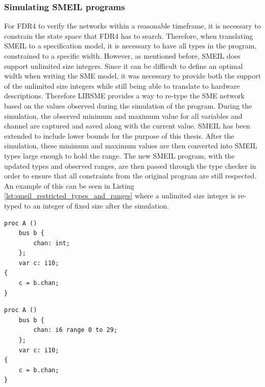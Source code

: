 \subsubsection{Simulating SMEIL programs}
For FDR4 to verify the networks within a reasonable timeframe, it is necessary to constrain the state space that FDR4 has to search. Therefore, when translating SMEIL to a specification model, it is necessary to have all types in the program, constrained to a specific width. However, as mentioned before, SMEIL does support unlimited size integers. Since it can be difficult to define an optimal width when writing the SME model, it was necessary to provide both the support of the unlimited size integers while still being able to translate to hardware descriptions. %
Therefore LIBSME provides a way to re-type the SME network based on the values observed during the simulation of the program.
During the simulation, the observed minimum and maximum value for all variables and channel are captured and saved along with the current value. SMEIL has been extended to include lower bounds for the purpose of this thesis.
After the simulation, these minimum and maximum values are then converted into SMEIL types large enough to hold the range.
The new SMEIL program, with the updated types and observed ranges, are then passed through the type checker in order to ensure that all constraints from the original program are still respected.
An example of this can be seen in Listing \ref{lst:smeil_restricted_types_and_ranges} where a unlimited size integer is re-typed to an integer of fixed size after the simulation.
\begin{minipage}[t]{.98\linewidth}
  \begin{minipage}[t]{0.45\linewidth}
    \begin{verbatim}
proc A ()
    bus b {
        chan: int;
    };
    var c: i10;
{
    c = b.chan;
}
    \end{verbatim}
    \label{lst:unconstrained_smeil_type}
  \end{minipage}
  \hspace{0.5cm}
  \begin{minipage}[t]{0.45\linewidth}
    \begin{verbatim}
proc A ()
    bus b {
        chan: i6 range 0 to 29;
    };
    var c: i10;
{
    c = b.chan;
}
    \end{verbatim}
    \label{lst:constrained_smeil_type}
  \end{minipage}
    \vspace{0.5cm}
   \label{lst:smeil_restricted_types_and_ranges}
   \vspace{1cm}
\end{minipage}
